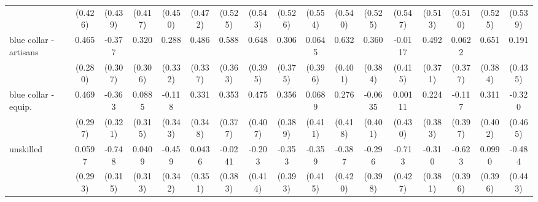 {\begin{tabular}{l*{16}{c}}
                    &     (0.426)         &     (0.439)         &     (0.417)         &     (0.450)         &     (0.472)         &     (0.525)         &     (0.543)         &     (0.526)         &     (0.554)         &     (0.540)         &     (0.525)         &     (0.547)         &     (0.513)         &     (0.510)         &     (0.525)         &     (0.539)         \\
[1em]
blue collar - artisans&       0.465         &      -0.377         &       0.320         &       0.288         &       0.486         &       0.588         &       0.648         &       0.306         &      0.0645         &       0.632         &       0.360         &     -0.0117         &       0.492         &      0.0622         &       0.651         &       0.191         \\
                    &     (0.280)         &     (0.307)         &     (0.306)         &     (0.332)         &     (0.337)         &     (0.363)         &     (0.395)         &     (0.375)         &     (0.396)         &     (0.401)         &     (0.384)         &     (0.415)         &     (0.371)         &     (0.377)         &     (0.384)         &     (0.435)         \\
[1em]
blue collar - equip.&       0.469         &      -0.363         &      0.0885         &      -0.118         &       0.331         &       0.353         &       0.475         &       0.356         &      0.0689         &       0.276         &     -0.0635         &     0.00111         &       0.224         &      -0.117         &       0.311         &      -0.320         \\
                    &     (0.297)         &     (0.321)         &     (0.315)         &     (0.343)         &     (0.348)         &     (0.377)         &     (0.407)         &     (0.389)         &     (0.411)         &     (0.418)         &     (0.401)         &     (0.430)         &     (0.383)         &     (0.397)         &     (0.402)         &     (0.465)         \\
[1em]
unskilled           &      0.0597         &      -0.748\sym{*}  &      0.0409         &      -0.459         &      0.0436         &     -0.0241         &      -0.203         &      -0.353         &      -0.359         &      -0.387         &      -0.296         &      -0.713         &      -0.310         &      -0.623         &      0.0990         &      -0.484         \\
                    &     (0.293)         &     (0.315)         &     (0.313)         &     (0.342)         &     (0.351)         &     (0.383)         &     (0.414)         &     (0.393)         &     (0.415)         &     (0.420)         &     (0.398)         &     (0.427)         &     (0.381)         &     (0.396)         &     (0.396)         &     (0.443)         \\

\end{tabular}}
